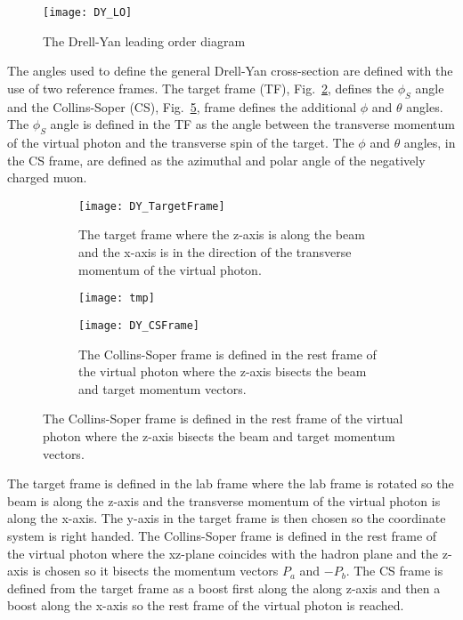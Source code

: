 \begin{figure}[h!t]
  \centering
  \texttt{[image: DY\_LO]}
  \caption{The Drell-Yan leading order diagram}
  \label{fig::DY_LO}
\end{figure}

The angles used to define the general Drell-Yan cross-section are defined with
the use of two reference frames.  The target frame (TF),
Fig.~\ref{fig::DY_TargetFrame}, defines the $\phi_S$ angle and the Collins-Soper
(CS), Fig.~\ref{fig::DY_CSFrame}, frame defines the additional $\phi$ and
$\theta$ angles.  The $\phi_S$ angle is defined in the TF as the angle between
the transverse momentum of the virtual photon and the transverse spin of the
target.  The $\phi$ and $\theta$ angles, in the CS frame, are defined as the
azimuthal and polar angle of the negatively charged muon.

\begin{figure}[h!t]
  \centering
  \begin{subfigure}{.46\textwidth}
    \centering
    \texttt{[image: DY\_TargetFrame]}
    \caption{The target frame where the z-axis is along the beam and the x-axis
      is in the direction of the transverse momentum of the virtual photon.}
    \label{fig::DY_TargetFrame}%
  \end{subfigure}
  \begin{subfigure}{.02\textwidth}
    \centering
    \texttt{[image: tmp]}
    \label{fig::tmp1}%
  \end{subfigure}
  \begin{subfigure}{.46\textwidth}
    \centering
    \texttt{[image: DY\_CSFrame]}
    \caption{The Collins-Soper frame is defined in the rest frame of the virtual
      photon where the z-axis bisects the beam and target momentum vectors.}
    \label{fig::DY_CSFrame}%
  \end{subfigure}
\end{figure}

The target frame is defined in the lab frame where the lab frame is rotated so
the beam is along the z-axis and the transverse momentum of the virtual photon
is along the x-axis.  The y-axis in the target frame is then chosen so the
coordinate system is right handed.  The Collins-Soper frame is defined in the
rest frame of the virtual photon where the xz-plane coincides with the hadron
plane and the z-axis is chosen so it bisects the momentum vectors $P_a$ and
$-P_b$.  The CS frame is defined from the target frame as a boost first along
the along z-axis and then a boost along the x-axis so the rest frame of the
virtual photon is reached.

